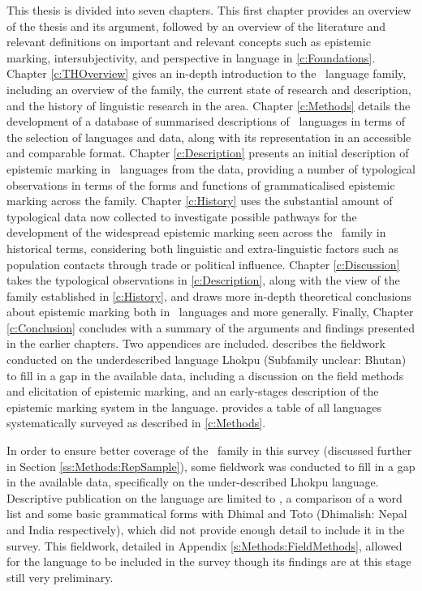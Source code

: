 This thesis is divided into seven chapters. This first chapter provides an overview of the thesis and its argument, followed by an overview of the literature and relevant definitions on important and relevant concepts such as epistemic marking, intersubjectivity, and perspective in language in \cref{c:Foundations}. Chapter \ref{c:THOverview} gives an in-depth introduction to the \lfam\ language family, including an overview of the family, the current state of research and description, and the history of linguistic research in the area. Chapter \ref{c:Methods} details the development of a database of summarised descriptions of \lfam\ languages in terms of the selection of languages and data, along with its representation in an accessible and comparable format. Chapter \ref{c:Description} presents an initial description of epistemic marking in \lfam\ languages from the data, providing a number of typological observations in terms of the forms and functions of grammaticalised epistemic marking across the family. Chapter \ref{c:History} uses the substantial amount of typological data now collected to investigate possible pathways for the development of the widespread epistemic marking seen across the \lfam\ family in historical terms, considering both linguistic and extra-linguistic factors such as population contacts through trade or political influence. Chapter \ref{c:Discussion} takes the typological observations in \cref{c:Description}, along with the view of the family established in \cref{c:History}, and draws more in-depth theoretical conclusions about epistemic marking both in \lfam\ languages and more generally. Finally, Chapter \ref{c:Conclusion} concludes with a summary of the arguments and findings presented in the earlier chapters. Two appendices are included.  describes the fieldwork conducted on the underdescribed language Lhokpu (Subfamily unclear: Bhutan) to fill in a gap in the available data, including a discussion on the field methods and elicitation of epistemic marking, and an early-stages description of the epistemic marking system in the language.  provides a table of all languages systematically surveyed as described in \cref{c:Methods}.

In order to ensure better coverage of the \lfam\ family in this survey (discussed further in Section \ref{ss:Methods:RepSample}), some fieldwork was conducted to fill in a gap in the available data, specifically on the under-described Lhokpu language. Descriptive publication on the language are limited to , a comparison of a word list and some basic grammatical forms with Dhimal and Toto (Dhimalish: Nepal and India respectively), which did not provide enough detail to include it in the survey. This fieldwork, detailed in Appendix \ref{s:Methods:FieldMethods}, allowed for the language to be included in the survey though its findings are at this stage still very preliminary.  

